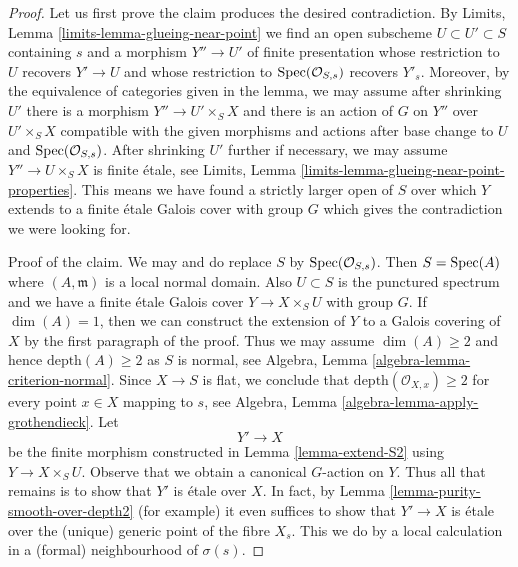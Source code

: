 \begin{proof}
\medskip\noindent
Let us first prove the claim produces the desired contradiction.
By Limits, Lemma \ref{limits-lemma-glueing-near-point}
we find an open subscheme $U \subset U' \subset S$
containing $s$ and a morphism $Y'' \to U'$ of finite presentation
whose restriction to $U$ recovers $Y' \to U$ and
whose restriction to $\mathop{\mathrm{Spec}}(\mathcal{O}_{S, s})$ recovers $Y'_s$.
Moreover, by the equivalence of categories given in the
lemma, we may assume after shrinking $U'$
there is a morphism $Y'' \to U' \times_S X$
and there is an action of $G$ on $Y''$ over $U' \times_S X$
compatible with the given morphisms and actions after base
change to $U$ and $\mathop{\mathrm{Spec}}(\mathcal{O}_{S, s})$.
After shrinking $U'$ further if necessary, we may
assume $Y'' \to U \times_S X$ is finite \'etale, see
Limits, Lemma \ref{limits-lemma-glueing-near-point-properties}.
This means we have found a strictly larger open of $S$ over which
$Y$ extends to a finite \'etale Galois cover with group $G$
which gives the contradiction we were looking for.

\medskip\noindent
Proof of the claim. We may and do replace $S$ by $\mathop{\mathrm{Spec}}(\mathcal{O}_{S, s})$.
Then $S = \mathop{\mathrm{Spec}}(A)$ where $(A, \mathfrak m)$ is a local normal domain.
Also $U \subset S$ is the punctured spectrum and we have a finite
\'etale Galois cover $Y \to X \times_S U$ with group $G$.
If $\dim(A) = 1$, then we can construct the extension of $Y$ to
a Galois covering of $X$ by the first paragraph of the proof.
Thus we may assume $\dim(A) \geq 2$ and hence $\text{depth}(A) \geq 2$
as $S$ is normal, see Algebra, Lemma \ref{algebra-lemma-criterion-normal}.
Since $X \to S$ is flat, we conclude that
$\text{depth}(\mathcal{O}_{X, x}) \geq 2$ for every point $x \in X$
mapping to $s$, see
Algebra, Lemma \ref{algebra-lemma-apply-grothendieck}.
Let
$$
Y' \longrightarrow X
$$
be the finite morphism constructed in Lemma \ref{lemma-extend-S2}
using $Y \to X \times_S U$. Observe that we obtain a canonical
$G$-action on $Y$. Thus all that remains is to show that $Y'$
is \'etale over $X$. In fact, by
Lemma \ref{lemma-purity-smooth-over-depth2} (for example)
it even suffices to show that $Y' \to X$ is \'etale over the
(unique) generic point of the fibre $X_s$. This we do by
a local calculation in a (formal) neighbourhood of $\sigma(s)$.


\end{proof}
